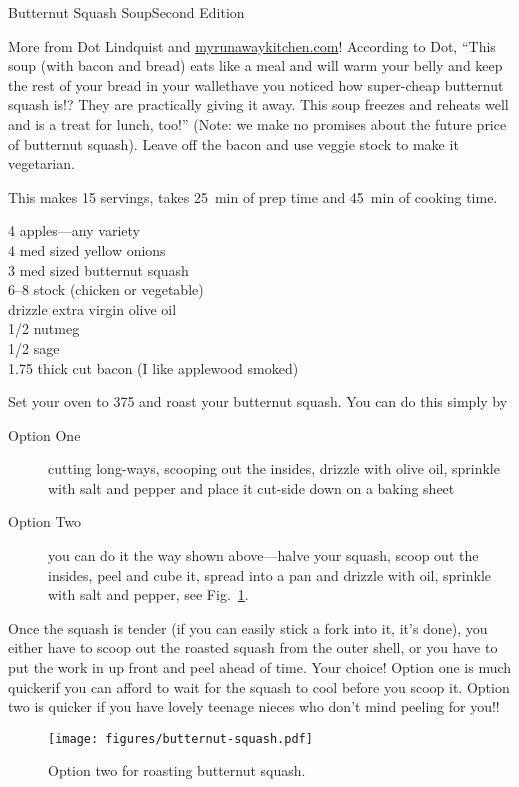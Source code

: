 \begin{entry}{Butternut Squash Soup}{Second Edition}

\begin{open}
  More from Dot Lindquist and \url{myrunawaykitchen.com}! According to Dot,
  ``This soup (with bacon and bread) eats like a meal and will warm your belly
  and keep the rest of your bread in your wallet\textellipsis have you noticed
  how super-cheap butternut squash is!?  They are practically giving it away.
  This soup freezes and reheats well and is a treat for lunch, too!'' (Note:
  we make no promises about the future price of butternut squash). Leave off the bacon and use veggie stock to make it vegetarian.

  This makes 15 servings, takes \SI{25}{\minute} of prep time and
  \SI{45}{\minute} of cooking time.
\end{open}
\begin{ingredients}
    4  apples---any variety\\
    4  med sized yellow onions\\
    3  med sized butternut squash\\
    \SIrange{6}{8}{\cup} stock (chicken or vegetable)\\
    drizzle  extra virgin olive oil\\
    \SI{1/2}{\teaspoon}  nutmeg\\
    \SI{1/2}{\teaspoon}  sage\\
    \SI{1.75}{\pound} thick cut bacon (I like applewood smoked)
\end{ingredients}
Set your oven to \SI{375}{\degreeF} and roast your butternut squash. You can
do this simply by
\begin{description}
    \item[Option One] cutting long-ways, scooping out the insides, drizzle with
    olive oil, sprinkle with salt and pepper and place it cut-side down on a
    baking sheet
    \item[Option Two] you can do it the way shown above---halve
    your squash, scoop out the insides, peel and cube it, spread into a pan and
    drizzle with oil, sprinkle with salt and pepper, see Fig.~\ref{fig:butternut-squash-two}.
\end{description}
Once the squash is tender (if you can easily stick a fork into it, it's done),
you either have to scoop out the roasted squash from the outer shell, or you
have to put the work in up front and peel ahead of time. Your choice! Option
one is much quicker\textellipsis if you can afford to wait for the squash to
cool before you scoop it. Option two is quicker if you have lovely teenage
nieces who don't mind peeling for you!!
\begin{figure}
    \centering
    \texttt{[image: figures/butternut-squash.pdf]}
    \caption{Option two for roasting butternut squash.}
    \label{fig:butternut-squash-two}
\end{figure}


\end{entry}
